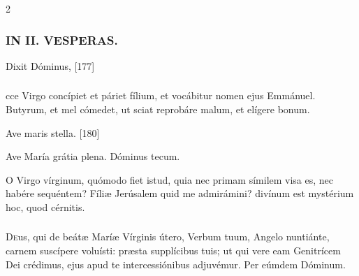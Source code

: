 \documentclass[9pt,twoside]{extarticle}
\begin{document}
\begin{multicols}{2}
\subsubsection*{\center \textsc{IN II. VESPERAS.}}
\begin{tightlist}{}
\item {}
\item {} Dixit Dóminus,  [177]
\end{tightlist}

\subsubsection*{}
cce Virgo concípiet et páriet fílium, et vocábitur nomen ejus Emmánuel. Butyrum, et mel cómedet, ut sciat reprobáre malum, et elígere bonum.

\begin{tightlist}{}
\item {} Ave maris stella. [180]
\item {} Ave María grátia plena.  Dóminus tecum.

\item {} O Virgo vírginum, quómodo fiet istud, quia nec primam símilem visa es, nec habére sequéntem? Fíliæ Jerúsalem quid me admirámini? divínum est mystérium hoc, quod cérnitis.
\end{tightlist}

\subsubsection*{\center {}}
\lettrine{D}eus, qui de beátæ Maríæ Vírginis útero, Verbum tuum, Angelo nuntiánte, carnem suscípere voluísti: præsta supplícibus tuis; ut qui vere eam Genitrícem Dei crédimus, ejus apud te intercessiónibus adjuvémur. Per eúmdem Dóminum.


\end{multicols}
\end{document}

